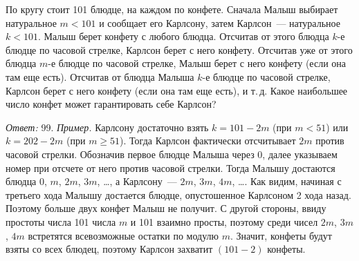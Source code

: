 \problem
По кругу стоит 101 блюдце, на каждом по конфете.
Сначала Малыш выбирает натуральное $m < 101$ и сообщает его Карлсону,
затем Карлсон~--- натуральное $k < 101$.
Малыш берет конфету с любого блюдца.
Отсчитав от этого блюдца $k$-е блюдце по часовой стрелке,
Карлсон берет с него конфету.
Отсчитав уже от этого блюдца $m$-е блюдце по часовой стрелке,
Малыш берет с него конфету (если она там еще есть).
Отсчитав от блюдца Малыша $k$-е блюдце по часовой стрелке,
Карлсон берет с него конфету (если она там еще есть), и т.\,д.
Какое наибольшее число конфет может гарантировать себе Карлсон?

\solution
\emph{Ответ:} 99.
\emph{Пример.}
Карлсону достаточно взять $k = 101 - 2 m$ (при $m < 51$) или $k = 202 - 2 m$
(при $m \geq 51$).
Тогда Карлсон фактически отсчитывает $2 m$ против часовой стрелки.
Обозначив первое блюдце Малыша через 0, далее указываем номер при отсчете от
него против часовой стрелки.
Тогда Малышу достаются блюдца $0$, $m$, $2 m$, $3 m$, \ldots,
а Карлсону~--- $2 m$, $3 m$, $4 m$, \ldots.
Как видим, начиная с третьего хода Малышу достается блюдце, опустошенное
Карлсоном 2 хода назад.
Поэтому больше двух конфет Малыш не получит.
С другой стороны, ввиду простоты числа 101 числа $m$ и 101 взаимно просты,
поэтому среди чисел $2 m$, $3 m$, $4 m$ встретятся всевозможные остатки по
модулю $m$.
Значит, конфеты будут взяты со всех блюдец, поэтому Карлсон захватит
$(101 - 2)$ конфеты.

\endproblem
